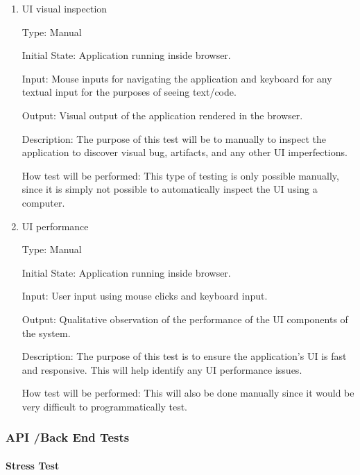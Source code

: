 \documentclass[12pt, titlepage]{article}
\begin{document}
    \begin{enumerate}

    \item{UI visual inspection\\}

    Type: Manual

    Initial State: Application running inside browser.

    Input: Mouse inputs for navigating the application and keyboard for any textual
    input for the purposes of seeing text/code.

    Output: Visual output of the application rendered in the browser.

    Description: The purpose of this test will be to manually to inspect the application to
    discover visual bug, artifacts, and any other UI imperfections.

    How test will be performed: This type of testing is only possible manually,
    since it is simply not possible to automatically inspect the UI using a
    computer.
              
    \item{UI performance\\}

    Type: Manual

    Initial State: Application running inside browser.

    Input: User input using mouse clicks and keyboard input.

    Output: Qualitative observation of the performance of the UI components of the
    system.

    Description: The purpose of this test is to ensure the application's UI
    is fast and responsive. This will help identify any UI performance issues.

    How test will be performed: This will also be done manually since it would
    be very difficult to programmatically test.
            
    \end{enumerate}

  \subsubsection{API /Back End Tests}
  \paragraph{Stress Test}
      
\end{document}
